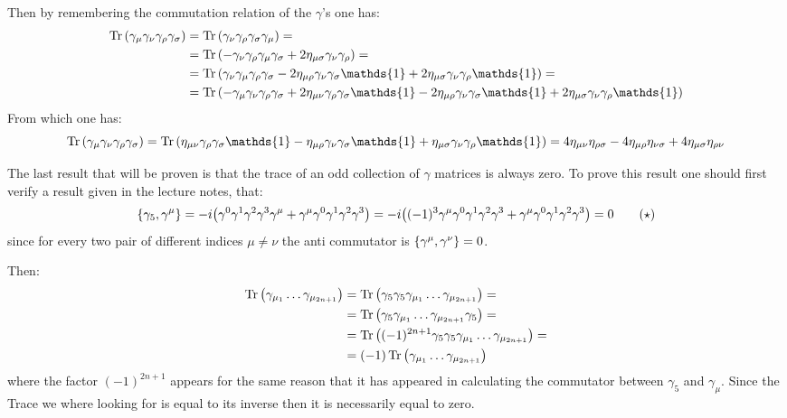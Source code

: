 \documentclass[11pt, oneside]{article}   	%
\begin{document}
Then by remembering the commutation relation of the $\gamma$'s one has:
\begin{align*}
	\Tr \qty( \gamma_\mu \gamma_\nu \gamma_\rho \gamma_\sigma ) &= \Tr \qty( \gamma_\nu \gamma_\rho \gamma_\sigma \gamma_\mu ) = \\ 
	&= \Tr \qty( -\gamma_{\nu} \gamma_{\rho} \gamma_\mu \gamma_\sigma + 2 \eta_{\mu\sigma} \gamma_\nu \gamma_\rho) = \\
	&= \Tr \qty( \gamma_{\nu} \gamma_\mu \gamma_\rho \gamma_\sigma - 2 \eta_{\mu\rho} \gamma_\nu \gamma_\sigma \mathds{1} + 2 \eta_{\mu\sigma} \gamma_\nu \gamma_\rho \mathds{1} ) = \\
	&= \Tr \qty( -\gamma_\mu \gamma_\nu \gamma_\rho \gamma_\sigma + 2 \eta_{\mu\nu} \gamma_\rho \gamma_\sigma \mathds{1} - 2 \eta_{\mu\rho} \gamma_\nu \gamma_\sigma \mathds{1} + 2 \eta_{\mu\sigma} \gamma_\nu \gamma_\rho \mathds{1}  ) 
\end{align*}
From which one has:
\[
	\Tr \qty( \gamma_\mu \gamma_\nu \gamma_\rho \gamma_\sigma ) = \Tr \qty(\eta_{\mu\nu} \gamma_\rho \gamma_\sigma \mathds{1} - \eta_{\mu\rho} \gamma_\nu \gamma_\sigma \mathds{1} + \eta_{\mu\sigma} \gamma_\nu \gamma_\rho \mathds{1}) = 4\eta_{\mu\nu}\eta_{\rho\sigma} - 4\eta_{\mu\rho}\eta_{\nu\sigma} + 4\eta_{\mu\sigma}\eta_{\rho\nu}
\]

The last result that will be proven is that the trace of an odd collection of $\gamma$ matrices is always zero. To prove this result one should first verify a result given in the lecture notes, that:
\[
	\acomm{\gamma_5}{\gamma^{\mu}} = -i \qty( \gamma^0\gamma^1\gamma^2\gamma^3 \gamma^\mu  + \gamma^\mu \gamma^0\gamma^1\gamma^2\gamma^3) = -i\qty((-1)^3 \gamma^\mu \gamma^0\gamma^1\gamma^2\gamma^3 + \gamma^\mu \gamma^0\gamma^1\gamma^2\gamma^3) = 0 \label{eq:comm-gamma-5} \tag{$\star$}
\]
since for every two pair of different indices $\mu \neq \nu$ the anti commutator is $\acomm{\gamma^\mu}{\gamma^\nu} = 0$.

Then:
\begin{align*}
	\Tr \qty( \gamma_{\mu_1} \dots \gamma_{\mu_{2n+1}}) &= \Tr \qty( \gamma_5 \gamma_5 \gamma_{\mu_1} \dots \gamma_{\mu_{2n+1}}) = \\
	&= \Tr \qty( \gamma_5 \gamma_{\mu_1} \dots \gamma_{\mu_{2n+1}} \gamma_5) = \\
	&= \Tr \qty( (-1)^{2n+1} \gamma_5 \gamma_5 \gamma_{\mu_1} \dots \gamma_{\mu_{2n+1}}) = \\
	&= (-1) \Tr \qty( \gamma_{\mu_1} \dots \gamma_{\mu_{2n+1}})
\end{align*}
where the factor $(-1)^{2n+1}$ appears for the same reason that it has appeared in calculating the commutator between $\gamma_5$ and $\gamma_\mu$. Since the Trace we where looking for is equal to its inverse then it is necessarily equal to zero.
\end{document}

